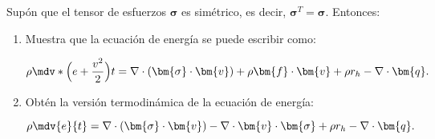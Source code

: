 \documentclass[../main.tex]{subfiles}
\begin{document}
\begin{problema}
	Supón que el tensor de esfuerzos \(\bm{\sigma}\) es simétrico,
	es decir, \(\bm{\sigma}^{T} = \bm{\sigma}\). Entonces:

	\begin{enumerate}
		\item Muestra que la ecuación de energía se puede escribir como:

		      \begin{equation*}
			      \rho \mdv*{\Bigl(e + \dfrac{v^{2}}{2}\Bigr)}{t} =
			      \nabla \cdot{(\bm{\sigma} \cdot \bm{v})} + \rho \bm{f} \cdot \bm{v} +
			      \rho r_{h} - \nabla \cdot{\bm{q}}.
		      \end{equation*}

		\item Obtén la versión termodinámica de la ecuación de energía:

		      \begin{equation*}
			      \rho\mdv{e}{t} = \nabla \cdot{(\bm{\sigma} \cdot \bm{v})} -
			      \nabla \cdot{\bm{v} \cdot \bm{\sigma}} + \rho r_{h} -
			      \nabla \cdot{\bm{q}}.
		      \end{equation*}
	\end{enumerate}
\end{problema}
\end{document}
